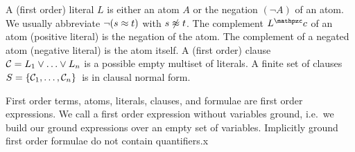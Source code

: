 
\begin{definition}\label{def:literals}\label{def:syntax:CNF}
A (first order) {\myem literal} $L$ is either an atom $A$ or the negation
$(\lnot A)$ of an atom. We usually abbreviate $\lnot(s\approx t)$ with $s\not\approx t$.
%
The {\myem complement} $L^\mcc$ of an atom (positive literal) is the negation of the atom.
The complement of a negated atom (negative literal) is the atom itself.
A (first order) {\myem clause}\ \ $\mathcal{C} = L_1\lor\ldots\lor L_n$  is a possible empty multiset of literals.
A finite {\myem set of clauses} $S=\{ \mathcal{C}_1,\ldots,\mathcal{C}_n \}$ is in {\myem clausal normal form}.
\end{definition}

\begin{remark}
	First order terms, atoms, literals, clauses, and formulae are first order expressions.
	We call a first order expression without variables {\myem ground},
	i.e.~we build our ground expressions over an empty set of variables.
	Implicitly ground first order formulae do not contain quantifiers.x
\end{remark}



